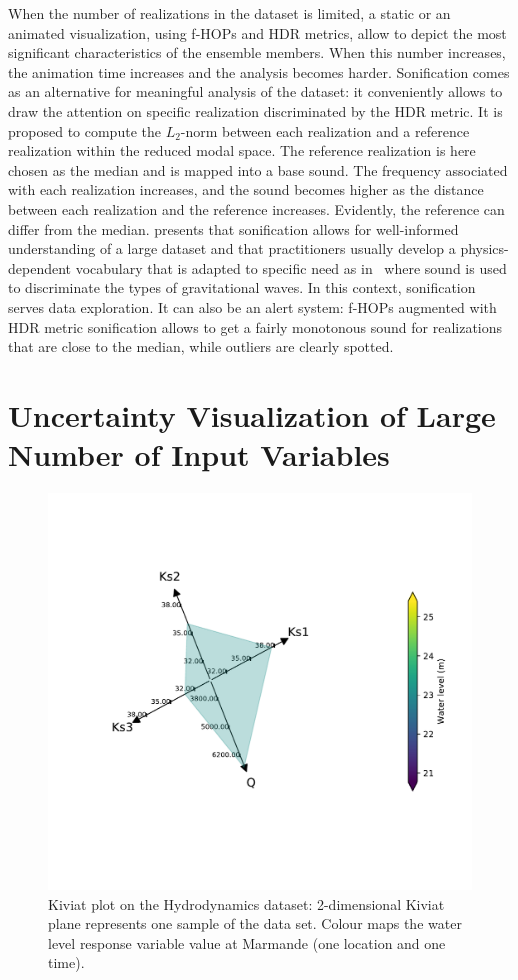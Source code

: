 When the number of realizations in the dataset is limited, a static or an animated visualization, using f-HOPs and HDR metrics, allow to depict the most significant characteristics of the ensemble members. When this number increases, the animation time increases and the analysis becomes harder. Sonification comes as an alternative for meaningful analysis of the dataset: it conveniently allows to draw the attention on specific realization discriminated by the HDR metric. It is proposed to compute the $L_2$-norm between each realization and a reference realization within the reduced modal space.  The reference realization is here chosen as the median and is mapped into a base sound. The frequency associated with each realization increases, and the sound becomes higher as the distance between each realization and the reference increases. Evidently, the reference can differ from the median. 
\citep{Alexander2014} presents that sonification allows for well-informed understanding of a large dataset and that practitioners usually develop a physics-dependent vocabulary that is adapted to specific need as in~\citep{Hughes2003} where sound is used to discriminate the types of gravitational waves. In this context, sonification serves data exploration. It  can also be an alert system: f-HOPs augmented with HDR metric sonification allows to get a fairly monotonous sound for realizations that are close to the median, while outliers are clearly spotted.%

\section{Uncertainty Visualization of Large Number of Input Variables}
\label{sec:input}

\begin{figure}[!ht]
\centering
\includegraphics[width=0.8\linewidth,keepaspectratio]{fig/contributions/visu/mascaret_2D.pdf}
\caption{Kiviat plot on the Hydrodynamics dataset: 2-dimensional Kiviat plane represents one sample of the data set. Colour maps the water level response variable value at Marmande (one location and one time).}
\label{fig:Kiviat_color}
\end{figure}

